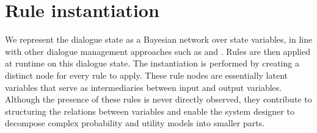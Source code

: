 

\section{Rule instantiation}
\label{sec:ruleinstantiation}

We represent the dialogue state as a Bayesian network over state variables, in line with other dialogue management approaches such as \cite{Thomson:2010:BUD:1772996.1773040} and \cite{bui2009}. Rules are then applied at runtime on this dialogue state.  The instantiation is performed by creating a distinct node for every rule to apply. These rule nodes are essentially latent variables that serve as intermediaries between input and output variables.  Although the presence of these rules is never directly observed, they contribute to structuring the relations between variables and enable the system designer to decompose complex probability and utility models into smaller parts.   %

